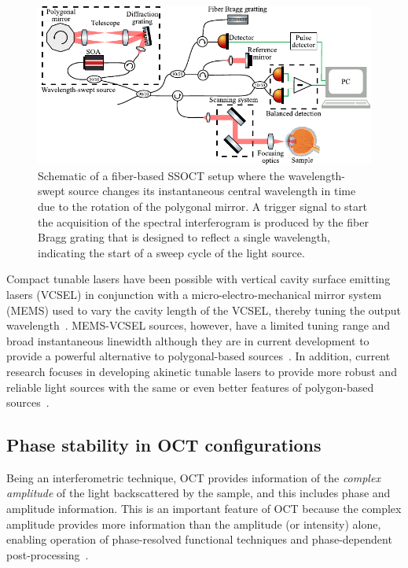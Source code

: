 \begin{figure}[htb!]
    \centering
    \includegraphics[width=\textwidth]{Figures/TheoreticalBasis/SSOCT_Scheme.pdf}
    \caption[Schematic of a fiber-based SSOCT setup.]{Schematic of a fiber-based SSOCT setup where the wavelength-swept source changes its instantaneous central wavelength in time due to the rotation of the polygonal mirror. A trigger signal to start the acquisition of the spectral interferogram is produced by the fiber Bragg grating that is designed to reflect a single wavelength, indicating the start of a sweep cycle of the light source.}
    \label{fig:SSOCT_Scheme}
\end{figure}

Compact tunable lasers have been possible with vertical cavity surface emitting lasers (VCSEL) in conjunction with a micro-electro-mechanical mirror system (MEMS) used to vary the cavity length of the VCSEL, thereby tuning the output wavelength~\cite{Vail1995_Tunable}. MEMS-VCSEL sources, however, have a limited tuning range and broad instantaneous linewidth although they are in current development to provide a powerful alternative to polygonal-based sources~\cite{Jayaraman2011_OCT}. In addition, current research focuses in developing akinetic tunable lasers to provide more robust and reliable light sources with the same or even better features of polygon-based sources~\cite{Lee2018_Akinetic}.

\subsection{Phase stability in OCT configurations}\label{sec:OCTConfigPhaseStab}

Being an interferometric technique, OCT provides information of the \textit{complex amplitude} of the light backscattered by the sample, and this includes phase and amplitude information. This is an important feature of OCT because the complex amplitude provides more information than the amplitude (or intensity) alone, enabling operation of phase-resolved functional techniques and phase-dependent post-processing~\cite{Park2020_Angiographic, Vakoc2005_Phaseresolved, White2003_vivo}.

